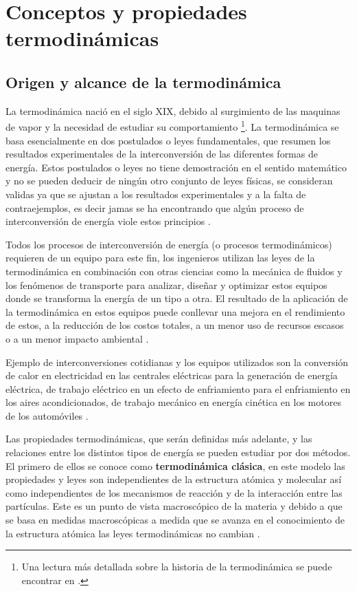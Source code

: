 \documentclass[master.tex]{subfiles}
\begin{document}
\section{Conceptos y propiedades termodinámicas}

\subsection{Origen y alcance de la termodinámica}

    La termodinámica nació en el siglo XIX, debido al surgimiento de las maquinas de vapor y la necesidad de estudiar su comportamiento \footnote{Una lectura más detallada sobre la historia de la termodinámica se puede encontrar en \cite{clavell}.}. La termodinámica se basa esencialmente en dos postulados o leyes fundamentales, que resumen los resultados experimentales de la interconversión de las diferentes formas de energía. Estos postulados o leyes no tiene demostración en el sentido matemático y no se pueden deducir de ningún otro conjunto de leyes físicas, se consideran validas ya que se ajustan a los resultados experimentales y a la falta de contraejemplos, es decir jamas se ha encontrando que algún proceso de interconversión de energía viole estos principios \parencites{glasstone}{smith-vanness}. 
    
    Todos los procesos de interconversión de energía (o procesos termodinámicos) requieren de un equipo para este fin, los ingenieros utilizan las leyes de la termodinámica en combinación con otras ciencias como la mecánica de fluidos y los fenómenos de transporte para analizar, diseñar y optimizar estos equipos donde se transforma la energía de un tipo a otra. El resultado de la aplicación de la termodinámica en estos equipos puede conllevar una mejora en el rendimiento de estos, a la reducción de los costos totales, a un menor uso de recursos escasos o a un menor impacto ambiental \parencites{wark}{moranshapiro}.
    
    Ejemplo de interconversiones cotidianas y los equipos utilizados son la conversión de calor en electricidad en las centrales eléctricas para la generación de energía eléctrica, de trabajo eléctrico en un efecto de enfriamiento para el enfriamiento en los aires acondicionados, de trabajo mecánico en energía cinética en los motores de los automóviles \parencite{faires}.

    Las propiedades termodinámicas, que serán definidas más adelante, y las relaciones entre los distintos tipos de energía se pueden estudiar por dos métodos. El primero de ellos se conoce como \textbf{termodinámica clásica}, en este modelo las propiedades y leyes son independientes de la estructura atómica y molecular así como independientes de los mecanismos de reacción y de la interacción entre las partículas. Este es un punto de vista macroscópico de la materia y debido a que se basa en medidas macroscópicas a medida que se avanza en el conocimiento de la estructura atómica las leyes termodinámicas no cambian \parencites{faires}{glasstone}{wark}.
\end{document}
